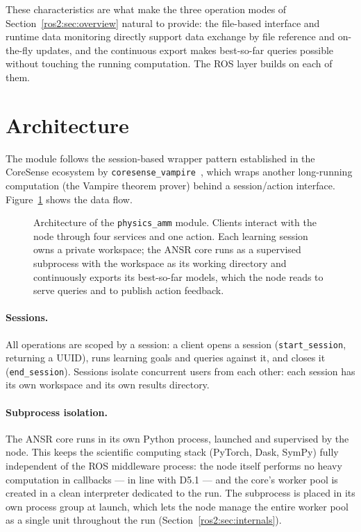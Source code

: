 These characteristics are what make the three operation modes of
Section~\ref{ros2:sec:overview} natural to provide: the file-based interface
and runtime data monitoring directly support data exchange by file reference
and on-the-fly updates, and the continuous export makes best-so-far queries
possible without touching the running computation. The ROS layer builds on
each of them.

\section{Architecture}
\label{ros2:sec:architecture}

The module follows the session-based wrapper pattern established in the
CoreSense ecosystem by \texttt{coresense\_vampire}~\cite{ros2:vampire}, which
wraps another long-running computation (the Vampire theorem prover) behind a
session/action interface. Figure~\ref{ros2:fig:architecture} shows the
data flow.

\begin{figure}[tb]
  \centering
  
  \caption{Architecture of the \texttt{physics\_amm} module. Clients interact
    with the node through four services and one action. Each learning session
    owns a private workspace; the ANSR core runs as a supervised subprocess
    with the workspace as its working directory and continuously exports its
    best-so-far models, which the node reads to serve queries and to publish
    action feedback.}
  \label{ros2:fig:architecture}
\end{figure}

\paragraph{Sessions.} All operations are scoped by a session: a client opens
a session (\texttt{start\_session}, returning a UUID), runs learning goals
and queries against it, and closes it (\texttt{end\_session}). Sessions
isolate concurrent users from each other: each session has its own workspace
and its own results directory.

\paragraph{Subprocess isolation.} The ANSR core runs in its own Python
process, launched and supervised by the node. This keeps the scientific
computing stack (PyTorch, Dask, SymPy) fully independent of the ROS
middleware process: the node itself performs no heavy computation in
callbacks --- in line with D5.1 --- and the core's worker pool is created in
a clean interpreter dedicated to the run. The subprocess is placed in its own
process group at launch, which lets the node manage the entire worker pool as
a single unit throughout the run (Section~\ref{ros2:sec:internals}).

